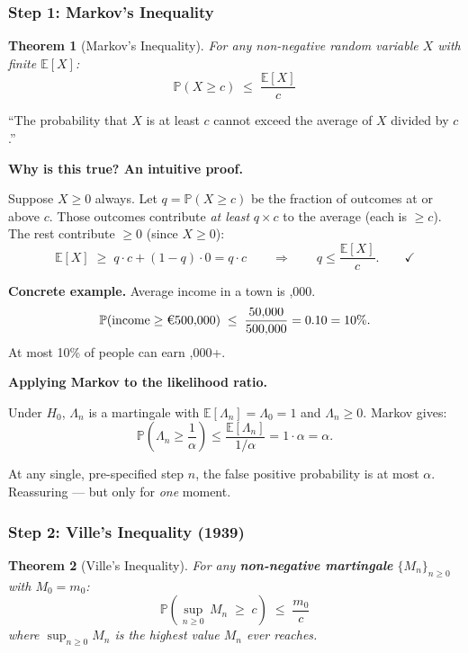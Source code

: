 \documentclass[12pt, a4paper]{article}
\newtheorem{theorem}{Theorem}
\newcommand{\E}{\mathbb{E}}            %
\newcommand{\Prob}{\mathbb{P}}         %
\newcommand{\LR}{\Lambda}              %
\begin{document}
\subsubsection*{Step 1: Markov's Inequality}

\begin{theorem}[Markov's Inequality]
For any non-negative random variable $X$ with finite $\E[X]$:
\[
  \boxed{\Prob(X \geq c) \;\leq\; \frac{\E[X]}{c}}
\]
\end{theorem}

\begin{plainlanguage}
``The probability that $X$ is at least $c$ cannot exceed the average of $X$
divided by $c$.''
\end{plainlanguage}

\textbf{Why is this true?  An intuitive proof.}

Suppose $X \geq 0$ always.  Let $q = \Prob(X \geq c)$ be the fraction of
outcomes at or above $c$.  Those outcomes contribute \emph{at least}
$q \times c$ to the average (each is $\geq c$).  The rest contribute $\geq 0$
(since $X \geq 0$):
\[
  \E[X] \;\geq\; q \cdot c + (1-q)\cdot 0 = q \cdot c
  \qquad\Longrightarrow\qquad
  q \leq \frac{\E[X]}{c}. \qquad\checkmark
\]

\textbf{Concrete example.}
Average income in a town is ,000.
\[
  \Prob(\text{income} \geq \text{\texteuro}500{,}000)
  \;\leq\;
  \frac{50{,}000}{500{,}000} = 0.10 = 10\%.
\]
At most 10\% of people can earn ,000+.

\textbf{Applying Markov to the likelihood ratio.}

Under $H_0$, $\LR_n$ is a martingale with $\E[\LR_n] = \LR_0 = 1$ and
$\LR_n \geq 0$.  Markov gives:
\[
  \Prob\!\left(\LR_n \geq \frac{1}{\alpha}\right)
  \leq \frac{\E[\LR_n]}{1/\alpha}
  = 1 \cdot \alpha
  = \alpha.
\]

\begin{plainlanguage}
At any single, pre-specified step $n$, the false positive probability
is at most $\alpha$.  Reassuring --- but only for \emph{one} moment.
\end{plainlanguage}

\subsubsection*{Step 2: Ville's Inequality (1939)}

\begin{theorem}[Ville's Inequality]
For any \textbf{non-negative martingale} $\{M_n\}_{n \geq 0}$ with
$M_0 = m_0$:
\[
  \boxed{\Prob\!\left(\sup_{n \geq 0}\, M_n \;\geq\; c\right)
         \;\leq\; \frac{m_0}{c}}
\]
where $\sup_{n\geq 0} M_n$ is the highest value $M_n$ \emph{ever} reaches.
\end{theorem}
\end{document}
